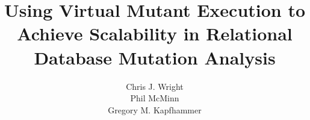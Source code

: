 \documentclass{sig-alternate}
\begin{document}
\title{Using Virtual Mutant Execution to Achieve Scalability in Relational Database Mutation Analysis \vspace*{-.1in}}



\author{
\alignauthor
Chris J. Wright\\
\alignauthor
Phil McMinn\\
\alignauthor
Gregory M. Kapfhammer\\
}

\maketitle

\vspace*{-.75in}











\end{document}
